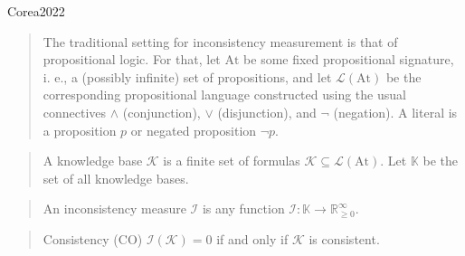 Corea2022

\begin{quote}
    The traditional setting for inconsistency measurement is that of propositional logic. For that, let $\text{At}$ be some fixed propositional signature, i. e., a (possibly infinite) set of propositions, and let $\mathcal{L}(\text{At})$ be the corresponding propositional language constructed using the usual connectives $\land$ (conjunction), $\lor$ (disjunction), and $\neg$ (negation). A literal is a proposition $p$ or negated proposition $\neg p$.
\end{quote}

\begin{quote}
    A knowledge base $\mathcal{K}$ is a finite set of formulas $\mathcal{K} \subseteq \mathcal{L}(\text{At})$. Let $\mathbb{K}$ be the set of all knowledge bases.
\end{quote}

\begin{quote}
    An inconsistency measure $\mathcal{I}$ is any function $\mathcal{I}: \mathbb{K} \rightarrow \mathbb{R}_{\geq 0}^{\infty}$.
\end{quote}

\begin{quote}
    Consistency (CO) $\mathcal{I}(\mathcal{K}) = 0$ if and only if $\mathcal{K}$ is consistent.
\end{quote}
